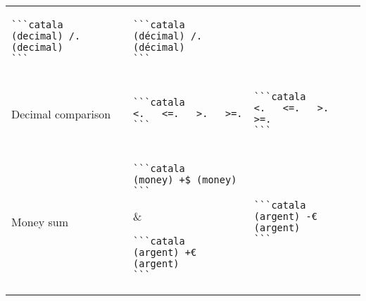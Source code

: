 \documentclass[a3paper,landscape]{article}
\begin{document}
\begin{multicols*}{2}
\begin{center}
\begin{tabular}{p{}p{}p{}}
      \begin{verbatim}
```catala
(decimal) /. (decimal)
```
\end{verbatim}
      \vspace*{-1.75em}
                                      &
      \vspace*{-1.75em}
      \begin{verbatim}
```catala
(décimal) /. (décimal)
```
\end{verbatim}
      \vspace*{-1.75em}
      \\
      Decimal comparison              &
      \vspace*{-1.75em}
      \begin{verbatim}
```catala
<.   <=.   >.   >=.
```
\end{verbatim}
      \vspace*{-1.75em}
                                      &
      \vspace*{-1.75em}
      \begin{verbatim}
```catala
<.   <=.   >.   >=.
```
\end{verbatim}
      \vspace*{-1.75em}
      \\
      Money sum                       &
      \vspace*{-1.75em}
      \begin{verbatim}
```catala
(money) +$ (money)
```
\end{verbatim}
      \vspace*{-1.75em}
                                      &
      \vspace*{-1.75em}
      \begin{verbatim}
```catala
(argent) +€ (argent)
```
\end{verbatim}
      \vspace*{-1.75em}
      \\
      Money substraction              &
      \vspace*{-1.75em}
      \begin{verbatim}
```catala
(money) -$ (money)
```
\end{verbatim}
      \vspace*{-1.75em}
                                      &
      \vspace*{-1.75em}
      \begin{verbatim}
```catala
(argent) -€ (argent)
```
\end{verbatim}

\end{tabular}
\end{center}
\end{multicols*}
\end{document}
